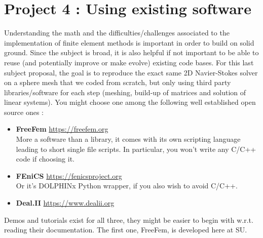 \documentclass[11pt]{article}
\begin{document}
\pagebreak
\section*{Project 4 : Using existing software}

Understanding the math and the difficulties/challenges associated to the
implementation of finite element methods is important in order to
build on solid ground. Since the subject is broad, it is also helpful if not 
important to be able to reuse (and potentially improve or make evolve) existing
code bases. For this last subject proposal, the goal is to reproduce the exact 
same 2D Navier-Stokes solver on a sphere mesh that we coded from scratch, but 
only using third party libraries/software for each step (meshing, build-up of
matrices and solution of linear systems). You might choose one among the
following well established open source ones :
\begin{itemize}
\item {\bf FreeFem} \url{https://freefem.org}\\
More a software than a library, it comes with its own scripting language 
leading to short single file scripts. In particular, you won't write any 
C/C++ code if choosing it.
\item {\bf FEniCS}  \url{https://fenicsproject.org}\\
Or it's DOLPHINx Python wrapper, if you also wish to avoid C/C++.
\item {\bf Deal.II} \url{https://www.dealii.org}\\
\end{itemize}
Demos and tutorials exist for all three, they might be easier to begin with
w.r.t. reading their documentation. The first one, FreeFem, is developed 
here at SU. 
\end{document}

